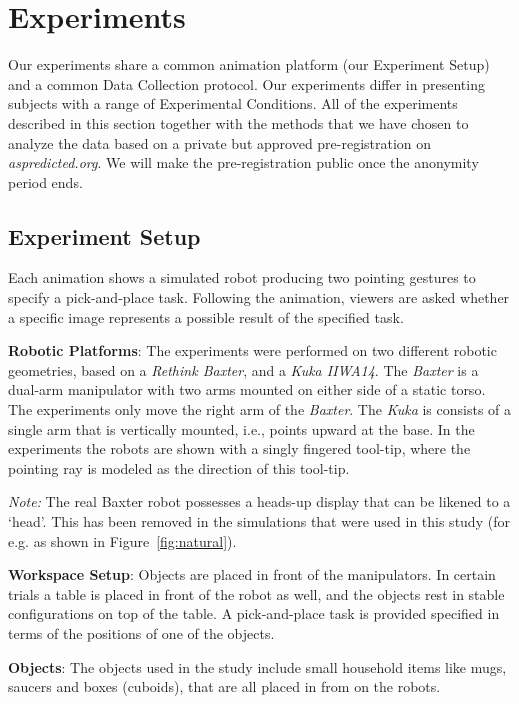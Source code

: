 \section{Experiments}
\label{experiments}


Our experiments share a common animation platform (our Experiment Setup) and a common Data Collection protocol.  Our experiments differ in presenting subjects with a range of Experimental Conditions.  All of the experiments described in this section together with the methods that we have chosen to analyze the data based on a private but approved pre-registration on \textit{aspredicted.org}. We will make the pre-registration public once the anonymity period ends.

\subsection{Experiment Setup}
Each animation shows a simulated robot producing two pointing gestures to specify a pick-and-place task.  Following the animation, viewers are asked whether a specific image represents a possible result of the specified task.

\noindent\textbf{Robotic Platforms}: The experiments were performed on two different robotic geometries, based on a \textit{Rethink Baxter}, and a \textit{Kuka IIWA14}.  The \textit{Baxter} is a dual-arm manipulator with two arms mounted on either side of a static torso. The experiments only move the right arm of the \textit{Baxter}. The \textit{Kuka} is consists of a single arm that is vertically mounted, i.e., points upward at the base. In the experiments the robots are shown with a singly fingered tool-tip, where the pointing ray is modeled as the direction of this tool-tip.

\textit{Note:} The real Baxter robot possesses a heads-up display that can be likened to a `head'. This has been removed in the simulations that were used in this study (for e.g. as shown in Figure~\ref{fig:natural}).

\noindent\textbf{Workspace Setup}: Objects are placed in front of the manipulators. In certain trials a table is placed in front of the robot as well, and the objects rest in stable configurations on top of the table. A pick-and-place task is provided specified in terms of the positions of one of the objects. 

\noindent\textbf{Objects}: The objects used in the study include small household items like mugs, saucers and boxes (cuboids), that are all placed in from on the robots.

